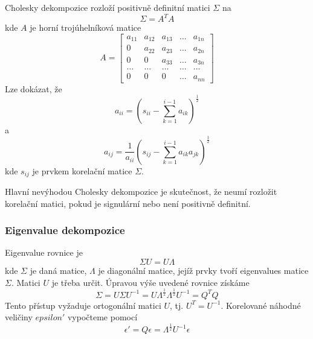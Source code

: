 Cholesky dekompozice rozloží positivně definitní matici $\Sigma$ na
\begin{equation}
\Sigma = A^T A
\end{equation}
kde $A$ je horní trojúhelníková matice
\begin{equation*}
A =
\begin{bmatrix}
a_{11} & a_{12} & a_{13} & \dots & a_{1n}\\
0 & a_{22} & a_{23} & \dots & a_{2n}\\
0 & 0 & a_{33} & \dots & a_{3n}\\
\dots & \dots & \dots & \dots & \dots\\
0 & 0 & 0 & \dots & a_{nn}
\end{bmatrix}
\end{equation*}
Lze dokázat, že
\begin{equation*}
a_{ii} = \left(s_{ii} - \sum_{k = 1}^{i - 1}a_{ik}\right) ^ {\frac{1}{2}}
\end{equation*}
a
\begin{equation*}
a_{ij} = \frac{1}{a_{ii}}\left(s_{ij} - \sum_{k = 1}^{i - 1} a_{ik} a_{jk}\right) ^ {\frac{1}{2}}
\end{equation*}
kde $s_{ij}$ je prvkem korelační matice $\Sigma$.

Hlavní nevýhodou Cholesky dekompozice je skutečnost, že neumí rozložit korelační matici, pokud je signulární nebo není positivně definitní.

\subsubsection{Eigenvalue dekompozice}

Eigenvalue rovnice je
\begin{equation*}
\Sigma U = U \Lambda
\end{equation*}
kde $\Sigma$ je daná matice, $\Lambda$ je diagonální matice, jejíž prvky tvoří eigenvalues matice $\Sigma$. Matici $U$ je třeba určit. Úpravou výše uvedené rovnice získáme
\begin{equation*}
\Sigma = U \Sigma U ^ {-1} = U \Lambda^{\frac{1}{2}} \Lambda^{\frac{1}{2}} U^{-1} = Q^{T}Q
\end{equation*}
Tento přístup vyžaduje ortogonální matici $U$, tj. $U^T = U^{-1}$. Korelované náhodné veličiny $epsilon'$ vypočteme pomocí
\begin{equation*}
\epsilon' = Q \epsilon = \Lambda^{\frac{1}{2}} U^{-1} \epsilon
\end{equation*}

